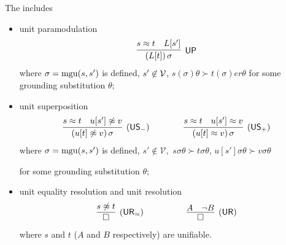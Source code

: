     \begin{corollary}

    \end{corollary}

    \begin{definition}
        The  includes
        \begin{itemize}
            \item unit paramodulation
            \begin{gather*}
            \infer
            [\mathsf{UP}]
            {(L[t])\,\sigma}
            {s\mEQ t&L[s']}
            \end{gather*}
            where \( \sigma=\operatorname{mgu}(s,s') \) is defined,
            \( s'\not\in\mathcal{V} \),
            \( s(\sigma)\theta\succ t(\sigma)er\theta \)
            for some grounding substitution \( \theta \);

            \item unit superposition
            \begin{gather*}
            \infer
            [\mathsf{(US_-)}]
            {(u[t]\mNE v)\,\sigma}
            {s\mEQ t&u[s']\mNE v}
            \qquad\qquad
            \infer
            [\mathsf{(US_+)}]
            {(u[t]\mEQ v)\,\sigma}
            {s\mEQ t&u[s']\mEQ v}
            \end{gather*}
            where \( \sigma=\operatorname{mgu}(s,s') \) is defined,
            \( s'\not\in\mathcal{V}, \)
            \( s\sigma\theta\succ t\sigma\theta \),
            \( u[s']\sigma\theta\succ v\sigma\theta \)

            for some grounding substitution \( \theta \);
            \item unit equality resolution and unit resolution
            \begin{gather*}
            \infer
            [\mathsf{(UR_\mEQ)}]
            {\emptyclause}
            {s\mNE t}
            \quad\quad\quad\qquad
            \infer
            [\mathsf{(UR)}]
            {\emptyclause}
            {A&\lnot B}
            \end{gather*}
            where \( s \) and \( t \) (\( A \) and \( B \) respectively) are unifiable.
        \end{itemize}
    \end{definition}

    \begin{definition}
    \end{definition}














